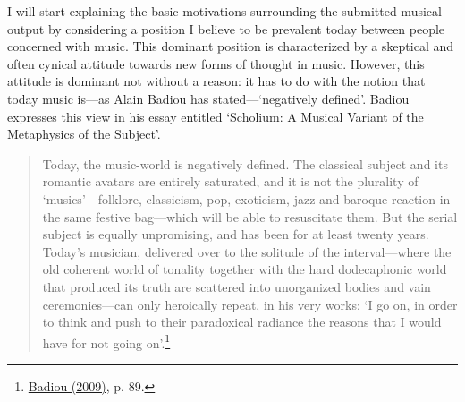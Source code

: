 I will start explaining the basic motivations surrounding the submitted musical output by considering a position I believe to be prevalent today between people concerned with music. This dominant position is characterized by a skeptical and often cynical attitude towards new forms of thought in music. However, this attitude is dominant not without a reason: it has to do with the notion that today music is---as Alain Badiou has stated---`negatively defined'. Badiou expresses this view in his essay entitled `Scholium: A Musical Variant of the Metaphysics of the Subject'.
\begin{quote}
Today, the music-world is negatively defined. The classical subject and its romantic avatars are entirely saturated, and it is not the plurality of `musics'---folklore, classicism, pop, exoticism, jazz and baroque reaction in the same festive bag---which will be able to resuscitate them. But the serial subject is equally unpromising, and has been for at least twenty years. Today's  musician, delivered over to the solitude of the interval---where the old coherent world of tonality together with the hard dodecaphonic world that produced its truth are scattered into unorganized bodies and vain ceremonies---can only heroically repeat, in his very works: `I go on, in order to think and push to their paradoxical radiance the reasons that I would have for not going on'.\footnote{\hyperlink{badioumus}{Badiou (2009)}, p. 89.} 
\end{quote}

